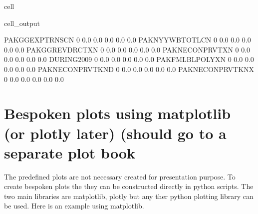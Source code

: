 \documentclass[letterpaper,10pt,english]{jupyterBook}
\begin{document}
\begin{sphinxuseclass}{cell}
\begin{sphinxVerbatimOutput}
\begin{sphinxuseclass}{cell_output}
\begin{sphinxVerbatim}[commandchars=\\\{\}]
PAKGGEXPTRNSCN    0         0.0\PYGZpc{}        0.0\PYGZpc{}        0.0\PYGZpc{}        0.0\PYGZpc{}        0.0\PYGZpc{}
PAKNYYWBTOTLCN    0         0.0\PYGZpc{}        0.0\PYGZpc{}        0.0\PYGZpc{}        0.0\PYGZpc{}        0.0\PYGZpc{}
PAKGGREVDRCTXN    0        \PYGZhy{}0.0\PYGZpc{}       \PYGZhy{}0.0\PYGZpc{}       \PYGZhy{}0.0\PYGZpc{}       \PYGZhy{}0.0\PYGZpc{}       \PYGZhy{}0.0\PYGZpc{}
PAKNECONPRVTXN    0        \PYGZhy{}0.0\PYGZpc{}       \PYGZhy{}0.0\PYGZpc{}       \PYGZhy{}0.0\PYGZpc{}       \PYGZhy{}0.0\PYGZpc{}       \PYGZhy{}0.0\PYGZpc{}
DURING\PYGZus{}2009       0        \PYGZhy{}0.0\PYGZpc{}       \PYGZhy{}0.0\PYGZpc{}       \PYGZhy{}0.0\PYGZpc{}       \PYGZhy{}0.0\PYGZpc{}       \PYGZhy{}0.0\PYGZpc{}
PAKFMLBLPOLYXN    0        \PYGZhy{}0.0\PYGZpc{}       \PYGZhy{}0.0\PYGZpc{}       \PYGZhy{}0.0\PYGZpc{}       \PYGZhy{}0.0\PYGZpc{}       \PYGZhy{}0.0\PYGZpc{}
PAKNECONPRVTKN\PYGZus{}D  0        \PYGZhy{}0.0\PYGZpc{}       \PYGZhy{}0.0\PYGZpc{}       \PYGZhy{}0.0\PYGZpc{}       \PYGZhy{}0.0\PYGZpc{}       \PYGZhy{}0.0\PYGZpc{}
PAKNECONPRVTKN\PYGZus{}X  0        \PYGZhy{}0.0\PYGZpc{}       \PYGZhy{}0.0\PYGZpc{}       \PYGZhy{}0.0\PYGZpc{}       \PYGZhy{}0.0\PYGZpc{}       \PYGZhy{}0.0\PYGZpc{}
\end{sphinxVerbatim}

\end{sphinxuseclass}\end{sphinxVerbatimOutput}

\end{sphinxuseclass}

\section{Bespoken plots using matplotlib  (or plotly \sphinxhyphen{}later) (should go to a separate plot book}
\label{\detokenize{content/notebooks/modelflow_features:bespoken-plots-using-matplotlib-or-plotly-later-should-go-to-a-separate-plot-book}}
\sphinxAtStartPar
The predefined plots are not necessary created for presentation purpose. To create  bespoken plots the they can be
constructed directly in python scripts. The two main libraries are matplotlib, plotly but any ther python plotting library can be used. Here is an example using matplotlib.
\end{document}
